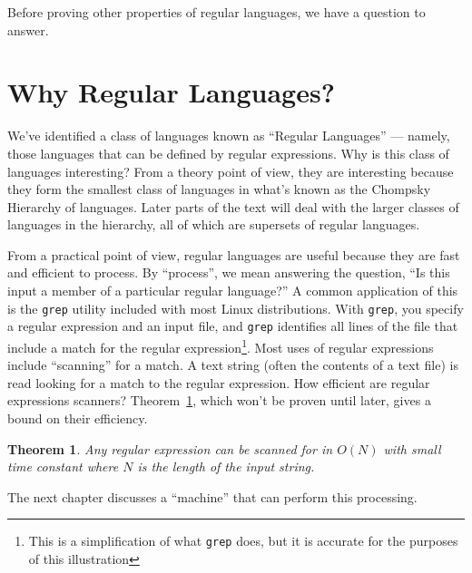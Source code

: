 \documentclass[letterpaper,12pt,openany,reqno]{book}%
\newcommand{\code}[1] {\lstinline[breaklines=yes,breakatwhitespace=yes]{#1}}
\newtheorem{theorem}{Theorem}
\begin{document}
Before proving other properties of regular languages, we have a question to answer.

\section{Why Regular Languages?}
We've identified a class of languages known as ``Regular Languages'' --- namely, those languages that can be defined by regular expressions. Why is this class of languages interesting? From a theory point of view, they are interesting because they form the smallest class of languages in what's known as the Chompsky Hierarchy of languages. Later parts of the text will deal with the larger classes of languages in the hierarchy, all of which are supersets of regular languages. 

From a practical point of view, regular languages are useful because they are fast and efficient to process. By ``process'', we mean answering the question, ``Is this input a member of a particular regular language?'' A common application of this is the \code{grep} utility included with most Linux distributions. With \code{grep}, you specify a regular expression and an input file, and \code{grep} identifies all lines of the file that include a match for the regular expression\footnote{This is a simplification of what \code{grep} does, but it is accurate for the purposes of this illustration}. Most uses of regular expressions include ``scanning'' for a match. A text string (often the contents of a text file) is read looking for a match to the regular expression. How efficient are regular expressions scanners? Theorem~\ref{TH.O.N.for.res}, which won't be proven until later, gives a bound on their efficiency.
\begin{theorem}
\label{TH.O.N.for.res}
Any regular expression can be scanned for in $O(N)$ with small time constant where $N$ is the length of the input string.
\end{theorem}

The next chapter discusses a ``machine'' that can perform this processing.
\end{document}
